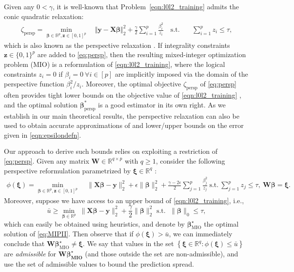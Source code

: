 \documentclass[mnsc,nonblindrev]{informs3} %
\begin{document}
Given any $0< \gamma$, it is well-known that Problem~\eqref{eqn:l0l2_training} admits the conic quadratic relaxation:
\begin{align}\label{eq:persp}
\zeta_{\text{persp}}=\min_{\bm{\beta} \in \mathbb{R}^p,\bm{z}\in [0,1]^p} \quad  \Vert \bm{y}-\bm{X}\bm{\beta}\Vert_2^2 +\frac{\gamma}{2} \sum_{i=1}^p \frac{\beta_i^2}{z_i} \quad \text{s.t.} \quad &\sum_{i=1}^pz_i \leq \tau,
\end{align}
which is also known as the {perspective relaxation} \citep[][]{ceria1999convex, xie2020scalable}.
If integrality constraints $\bm{z}\in \{0,1\}^p$ are added to \eqref{eq:persp}, then the resulting mixed-integer optimization problem (MIO) is a reformulation of \eqref{eqn:l0l2_training}, where the logical constraints $z_i=0$ if $\beta_i= 0 \ \forall i \in [p]$ are implicitly imposed via the domain of the perspective function $\beta_i^2/z_i$. Moreover, the optimal objective $\zeta_{\text{persp}}$ of \eqref{eq:persp} often provides tight lower bounds on the objective value of \eqref{eqn:l0l2_training} \citep[]{pilanci2015sparse,bertsimas2020sparse}, and the optimal solution $\bm{\beta}_{\text{persp}}^*$ is a good estimator in its own right. As we establish in our main theoretical results, the perspective relaxation can also be used to obtain accurate approximations of and lower/upper bounds on the error given in \eqref{eqn:epsilondefn}.

\iffalse Our approach to derive such bounds relies on exploiting a restriction of \eqref{eq:persp}. Given any matrix $\bm{W}\in \mathbb{R}^{q\times p}$ with $q\geq 1$, consider the following perspective reformulation parametrized by $\bm{\xi}\in \mathbb{R}^q$ :
\begin{align}\label{eq:perspRestricted}
	\phi(\bm{\xi})=\min_{\bm{\beta}\in \mathbb{R}^p,\bm{z}\in [0,1]^p}\;& \|\bm{X}\bm{\beta}-\bm{y}\|_2^2+\epsilon\|\bm{\beta}\|_2^2+\frac{\gamma-2\epsilon}{2}\sum_{j=1}^p \frac{\beta_j^2}{z_j}\ \text{s.t.}\ \sum_{j=1}^p z_j\leq \tau,\ \bm{W\beta}=\bm{\xi}.
\end{align}
Moreover, suppose we have access to an upper bound of \eqref{eqn:l0l2_training}, i.e., 
\begin{equation}\label{eq:MIPII}
		\bar u\geq \min_{\bm{\beta}\in \mathbb{R}^p}\; \|\bm{X}\bm{\beta}-\bm{y}\|_2^2+\frac{\gamma}{2}\|\bm{\beta}\|_2^2
		\text{ s.t. }\; \|\bm{\beta}\|_0\leq \tau,
	\end{equation} 
 which can easily be obtained using heuristics, and denote by $\bm{\beta}^\star_{\text{MIO}}$ the optimal solution of \eqref{eq:MIPII}. Then observe that if $\phi(\bm{\xi})>\bar u$, we can immediately conclude that $\bm{W}\bm{\beta}^\star_{\text{MIO}}\neq \bm{\xi}$. We say that values in the set $\left\{\bm{\xi}\in \mathbb{R}^q:\phi(\bm{\xi})\leq \bar u\right\}$ are \emph{admissible} for $\bm{W\bm{\beta}^\star_{\text{MIO}}}$ (and those outside the set are non-admissible), and use the set of admissible values to bound the prediction spread. 
 
\end{document}
